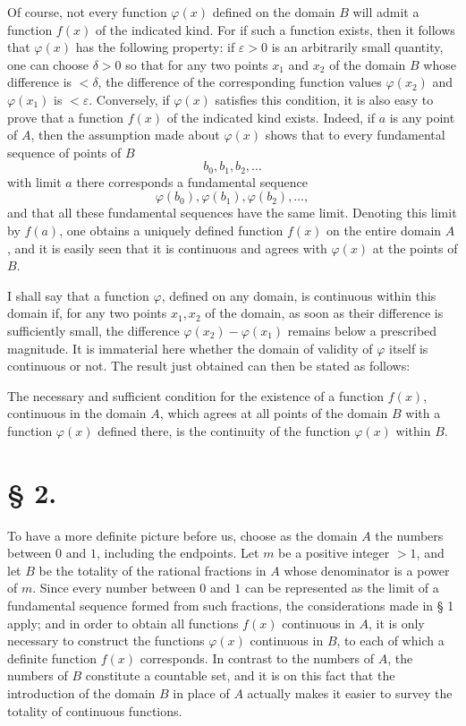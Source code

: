 Of course, not every function $\varphi(x)$ defined on the domain $B$ will admit a function $f(x)$ of the indicated kind. For if such a function exists, then it follows that $\varphi(x)$ has the following property: if $\varepsilon>0$ is an arbitrarily small quantity, one can choose $\delta>0$ so that for any two points $x_1$ and $x_2$ of the domain $B$ whose difference is $<\delta$, the difference of the corresponding function values $\varphi(x_2)$ and $\varphi(x_1)$ is $<\varepsilon$. Conversely, if $\varphi(x)$ satisfies this condition, it is also easy to prove that a function $f(x)$ of the indicated kind exists. Indeed, if $a$ is any point of $A$, then the assumption made about $\varphi(x)$ shows that to every fundamental sequence of points of $B$
\[
 b_0,b_1,b_2,\ldots
\]
with limit $a$ there corresponds a fundamental sequence
\[
 \varphi(b_0),\varphi(b_1),\varphi(b_2),\ldots,
\]
and that all these fundamental sequences have the same limit. Denoting this limit by $f(a)$, one obtains a uniquely defined function $f(x)$ on the entire domain $A$, and it is easily seen that it is continuous and agrees with $\varphi(x)$ at the points of $B$.

I shall say that a function $\varphi$, defined on any domain, is continuous within this domain if, for any two points $x_1,x_2$ of the domain, as soon as their difference is sufficiently small, the difference $\varphi(x_2)-\varphi(x_1)$ remains below a prescribed magnitude. It is immaterial here whether the domain of validity of $\varphi$ itself is continuous or not. The result just obtained can then be stated as follows:

The necessary and sufficient condition for the existence of a function $f(x)$, continuous in the domain $A$, which agrees at all points of the domain $B$ with a function $\varphi(x)$ defined there, is the continuity of the function $\varphi(x)$ within $B$.

\section*{§ 2.}

To have a more definite picture before us, choose as the domain $A$ the numbers between $0$ and $1$, including the endpoints. Let $m$ be a positive integer $>1$, and let $B$ be the totality of the rational fractions in $A$ whose denominator is a power of $m$. Since every number between $0$ and $1$ can be represented as the limit of a fundamental sequence formed from such fractions, the considerations made in § 1 apply; and in order to obtain all functions $f(x)$ continuous in $A$, it is only necessary to construct the functions $\varphi(x)$ continuous in $B$, to each of which a definite function $f(x)$ corresponds. In contrast to the numbers of $A$, the numbers of $B$ constitute a countable set, and it is on this fact that the introduction of the domain $B$ in place of $A$ actually makes it easier to survey the totality of continuous functions.

